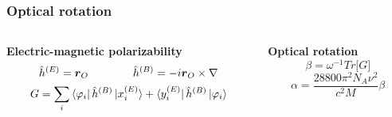 \begin{frame}
\frametitle{Optical rotation}
\begin{columns}

\begin{column}[b]{0.5\textwidth}
\centering
\textbf{Electric-magnetic polarizability}
\begin{equation}
    \nonumber
    \hat{h}^{(E)} = \boldsymbol{r}_O \qquad \qquad
    \hat{h}^{(B)} = -i \boldsymbol{r}_O\times\nabla
\end{equation}
\vspace{4mm}
\begin{equation}
    \nonumber
    G = \sum_i 
    \bra{\varphi_i}\hat{h}^{(B)} \ket{x_i^{(E)}} + 
    \bra{y_i^{(E)}}\hat{h}^{(B)}\ket{\varphi_i}
\end{equation}
\end{column}

\begin{column}[b]{0.5\textwidth}
\centering
\textbf{Optical rotation}
\vspace{2mm}
\begin{equation}
    \nonumber
    \beta = \omega^{-1}Tr\big[G\big]
\end{equation}
\vspace{2mm}
\begin{equation}
    \nonumber
    \alpha = \frac{28800\pi^2N_A\nu^2}{c^2M}\beta
\end{equation}
\end{column}

\end{columns}
\vspace{5mm}


\end{frame}
